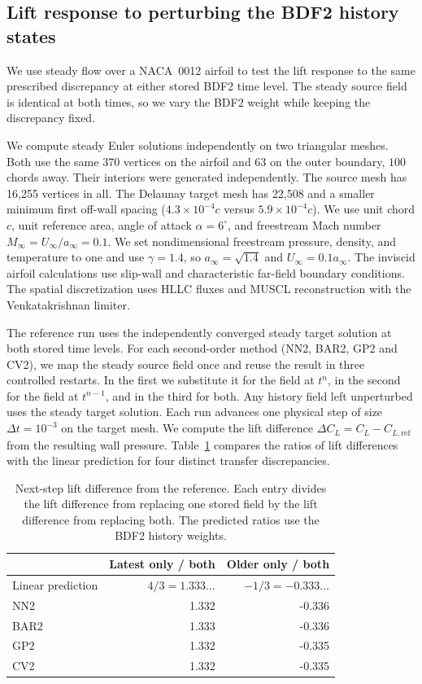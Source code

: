 \documentclass[a4paper,fleqn]{cas-sc}
\begin{document}
\FloatBarrier
\subsection{Lift response to perturbing the BDF2 history states}
\label{sec:naca-fixed-methodology}

We use steady flow over a NACA~0012 airfoil to test the lift response to the same prescribed discrepancy at either stored BDF2 time level. The steady source field is identical at both times, so we vary the BDF2 weight while keeping the discrepancy fixed.

We compute steady Euler solutions independently on two triangular meshes. Both use the same 370 vertices on the airfoil and 63 on the outer boundary, $100$ chords away. Their interiors were generated independently. The source mesh has 16,255 vertices in all. The Delaunay target mesh has 22,508 and a smaller minimum first off-wall spacing ($4.3\times10^{-4}c$ versus $5.9\times10^{-4}c$). We use unit chord $c$, unit reference area, angle of attack $\alpha=6^\circ$, and freestream Mach number $M_\infty=U_\infty/a_\infty=0.1$. We set nondimensional freestream pressure, density, and temperature to one and use $\gamma=1.4$, so $a_\infty=\sqrt{1.4}$ and $U_\infty=0.1a_\infty$. The inviscid airfoil calculations use slip-wall and characteristic far-field boundary conditions. The spatial discretization uses HLLC fluxes and MUSCL reconstruction with the Venkatakrishnan limiter.

The reference run uses the independently converged steady target solution at both stored time levels. For each second-order method (NN2, BAR2, GP2 and CV2), we map the steady source field once and reuse the result in three controlled restarts. In the first we substitute it for the field at $t^n$, in the second for the field at $t^{n-1}$, and in the third for both. Any history field left unperturbed uses the steady target solution. Each run advances one physical step of size $\Delta t=10^{-3}$ on the target mesh. We compute the lift difference $\Delta C_L=C_L-C_{L,\mathrm{ref}}$ from the resulting wall pressure. Table~\ref{tab:naca-first-lift} compares the ratios of lift differences with the linear prediction for four distinct transfer discrepancies.

\begin{table}[pos=htbp]
\centering\small
\caption{Next-step lift difference from the reference. Each entry divides the lift difference from replacing one stored field by the lift difference from replacing both. The predicted ratios use the BDF2 history weights.}
\label{tab:naca-first-lift}
\begin{tabular}{@{}lrr@{}}
\toprule
 & Latest only / both & Older only / both\\
\midrule
Linear prediction & $4/3=1.333\ldots$ & $-1/3=-0.333\ldots$\\
NN2 & 1.332 & -0.336 \\
BAR2 & 1.333 & -0.336 \\
GP2 & 1.332 & -0.335 \\
CV2 & 1.332 & -0.335 \\
\bottomrule
\end{tabular}
\end{table}
\end{document}
